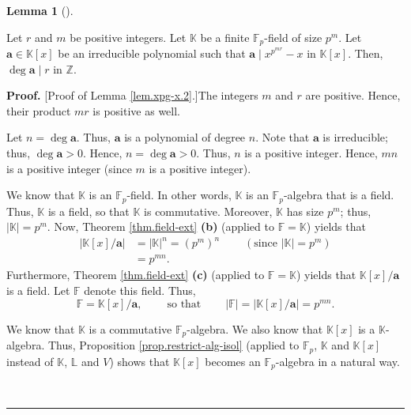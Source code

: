 \documentclass[numbers=enddot,12pt,final,onecolumn,notitlepage]{scrartcl}%
\theoremstyle{definition}
\newtheorem{lem}[theo]{Lemma}
\newenvironment{lemma}[1][]
{\begin{lem}[#1]\begin{leftbar}}
{\end{leftbar}\end{lem}}
\newenvironment{proof}[1][Proof]{\noindent\textbf{#1.} }{\ \rule{0.5em}{0.5em}}
\begin{document}
\begin{lemma}
\label{lem.xpg-x.2}Let $r$ and $m$ be positive integers. Let $\mathbb{K}$ be a
finite $\mathbb{F}_{p}$-field of size $p^{m}$. Let $\mathbf{a}\in
\mathbb{K}\left[  x\right]  $ be an irreducible polynomial such that
$\mathbf{a}\mid x^{p^{mr}}-x$ in $\mathbb{K}\left[  x\right]  $. Then,
$\deg\mathbf{a}\mid r$ in $\mathbb{Z}$.
\end{lemma}

\begin{proof}
[Proof of Lemma \ref{lem.xpg-x.2}.]The integers $m$ and $r$ are positive.
Hence, their product $mr$ is positive as well.

Let $n=\deg\mathbf{a}$. Thus, $\mathbf{a}$ is a polynomial of degree $n$. Note
that $\mathbf{a}$ is irreducible; thus, $\deg\mathbf{a}>0$. Hence,
$n=\deg\mathbf{a}>0$. Thus, $n$ is a positive integer. Hence, $mn$ is a
positive integer (since $m$ is a positive integer).

We know that $\mathbb{K}$ is an $\mathbb{F}_{p}$-field. In other words,
$\mathbb{K}$ is an $\mathbb{F}_{p}$-algebra that is a field. Thus,
$\mathbb{K}$ is a field, so that $\mathbb{K}$ is commutative. Moreover,
$\mathbb{K}$ has size $p^{m}$; thus, $\left\vert \mathbb{K}\right\vert =p^{m}%
$. Now, Theorem \ref{thm.field-ext} \textbf{(b)} (applied to $\mathbb{F}%
=\mathbb{K}$) yields that
\begin{align*}
\left\vert \mathbb{K}\left[  x\right]  /\mathbf{a}\right\vert  &  =\left\vert
\mathbb{K}\right\vert ^{n}=\left(  p^{m}\right)  ^{n}%
\ \ \ \ \ \ \ \ \ \ \left(  \text{since }\left\vert \mathbb{K}\right\vert
=p^{m}\right) \\
&  =p^{mn}.
\end{align*}
Furthermore, Theorem \ref{thm.field-ext} \textbf{(c)} (applied to
$\mathbb{F}=\mathbb{K}$) yields that $\mathbb{K}\left[  x\right]  /\mathbf{a}$
is a field. Let $\mathbb{F}$ denote this field. Thus,
\[
\mathbb{F}=\mathbb{K}\left[  x\right]  /\mathbf{a}%
,\ \ \ \ \ \ \ \ \ \ \text{so that}\ \ \ \ \ \ \ \ \ \ \left\vert
\mathbb{F}\right\vert =\left\vert \mathbb{K}\left[  x\right]  /\mathbf{a}%
\right\vert =p^{mn}.
\]


We know that $\mathbb{K}$ is a commutative $\mathbb{F}_{p}$-algebra. We also
know that $\mathbb{K}\left[  x\right]  $ is a $\mathbb{K}$-algebra. Thus,
Proposition \ref{prop.restrict-alg-isol} (applied to $\mathbb{F}_{p}$,
$\mathbb{K}$ and $\mathbb{K}\left[  x\right]  $ instead of $\mathbb{K}$,
$\mathbb{L}$ and $V$) shows that $\mathbb{K}\left[  x\right]  $ becomes an
$\mathbb{F}_{p}$-algebra in a natural way.


\end{proof}
\end{document}
